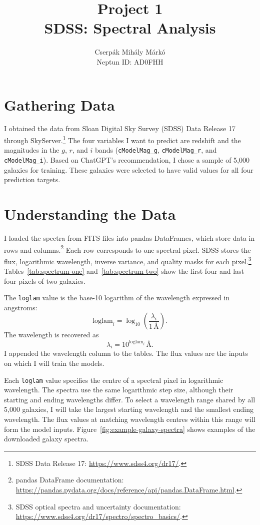 \documentclass[12pt,a4paper]{article}
\title{Project 1\\SDSS: Spectral Analysis}
\author{Cserpák Mihály Márkó\\Neptun ID: AD0FHH}
\date{}
\begin{document}
\maketitle

\section{Gathering Data}

I obtained the data from Sloan Digital Sky Survey (SDSS) Data Release 17 through SkyServer.\footnote{SDSS Data Release 17: \url{https://www.sdss4.org/dr17/}.} The four variables I want to predict are redshift and the magnitudes in the $g$, $r$, and $i$ bands (\texttt{cModelMag\_g}, \texttt{cModelMag\_r}, and \texttt{cModelMag\_i}). Based on ChatGPT's recommendation, I chose a sample of 5,000 galaxies for training. These galaxies were selected to have valid values for all four prediction targets.

\section{Understanding the Data}

I loaded the spectra from FITS files into pandas DataFrames, which store data in rows and columns.\footnote{pandas DataFrame documentation: \url{https://pandas.pydata.org/docs/reference/api/pandas.DataFrame.html}.} Each row corresponds to one spectral pixel. SDSS stores the flux, logarithmic wavelength, inverse variance, and quality masks for each pixel.\footnote{SDSS optical spectra and uncertainty documentation: \url{https://www.sdss4.org/dr17/spectro/spectro_basics/}.} Tables~\ref{tab:spectrum-one} and~\ref{tab:spectrum-two} show the first four and last four pixels of two galaxies.

The \texttt{loglam} value is the base-10 logarithm of the wavelength expressed in angstroms:
\begin{equation}
    \mathrm{loglam}_i = \log_{10}\!\left(\frac{\lambda_i}{1\,\text{\AA}}\right).
\end{equation}
The wavelength is recovered as
\begin{equation}
    \lambda_i = 10^{\mathrm{loglam}_i}\,\text{\AA}.
\end{equation}
I appended the wavelength column to the tables. The flux values are the inputs on which I will train the models.

Each \texttt{loglam} value specifies the centre of a spectral pixel in logarithmic wavelength. The spectra use the same logarithmic step size, although their starting and ending wavelengths differ. To select a wavelength range shared by all 5,000 galaxies, I will take the largest starting wavelength and the smallest ending wavelength. The flux values at matching wavelength centres within this range will form the model inputs.
 Figure~\ref{fig:example-galaxy-spectra} shows examples of the downloaded galaxy spectra.
\end{document}
